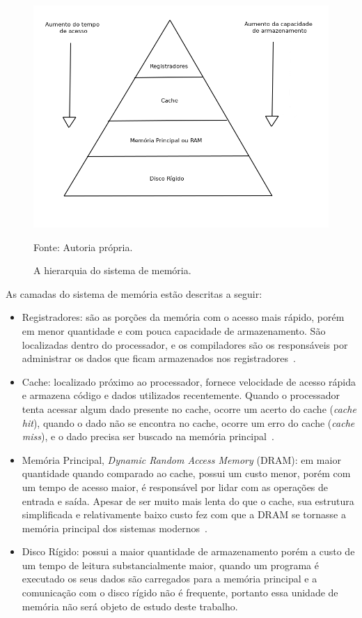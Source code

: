\documentclass[11pt]{article}
\begin{document}
\begin{figure}[h!]
    \centering
    \includegraphics[width =.6\textwidth]{figuras/memoryhierarchy}
    \caption{A hierarquia do sistema de memória.}
    Fonte: Autoria própria.
    \label{memhier}
\end{figure}

As camadas do sistema de memória estão descritas a seguir: 

\begin{itemize}
    \item Registradores: são as porções da memória com o acesso mais rápido, porém em menor quantidade e com 
        pouca capacidade de armazenamento. São localizadas dentro do processador, e os compiladores são os responsáveis 
        por administrar os dados que ficam armazenados nos registradores~\cite{Clements:2006:PCH:1214951}.
    \item Cache: localizado próximo ao processador, fornece velocidade de acesso rápida e armazena código e dados utilizados 
        recentemente. Quando o processador tenta acessar algum dado presente no cache, ocorre um acerto do cache 
        (\textit{cache hit}), quando o dado não se encontra no cache, ocorre um erro do cache (\textit{cache miss}), e o dado 
        precisa ser buscado na memória principal~\cite{Mahapatra:1999:PBP:357783.331677}.
    \item Memória Principal, \textit{Dynamic Random Access Memory} (DRAM): em maior quantidade quando comparado ao cache,
        possui um custo menor, porém com um tempo de acesso 
        maior, é responsável por lidar com as operações de entrada e saída. Apesar de ser muito mais lenta do que o cache, sua 
        estrutura simplificada e relativamente baixo custo fez com que a DRAM se tornasse a memória principal dos sistemas 
        modernos~\cite{Mahapatra:1999:PBP:357783.331677}.
    \item Disco Rígido: possui a maior quantidade de armazenamento porém a custo de um tempo de leitura substancialmente maior, 
        quando um programa é executado os seus dados são carregados para a memória principal e a comunicação com o disco rígido 
        não é frequente, portanto essa unidade de memória não será objeto de estudo deste trabalho.
\end{itemize}
\end{document}
